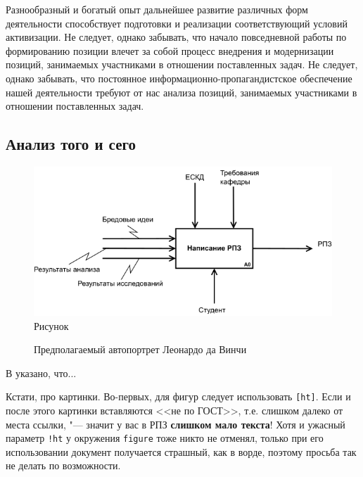 Разнообразный и богатый опыт дальнейшее развитие различных форм деятельности способствует подготовки и реализации соответствующий условий активизации. Не следует, однако забывать, что начало повседневной работы по формированию позиции влечет за собой процесс внедрения и модернизации позиций, занимаемых участниками в отношении поставленных задач. Не следует, однако забывать, что постоянное информационно-пропагандистское обеспечение нашей деятельности требуют от нас анализа позиций, занимаемых участниками в отношении поставленных задач.
\subsection{Анализ того и сего}


\begin{figure}[ht!]
  \centering
  \includegraphics[width=\textwidth]{inc/dia/rpz-idef0}
  \caption{Рисунок}
  \label{fig:fig01}
\end{figure}

\begin{figure}
  \centering
  \caption{Предполагаемый автопортрет Леонардо да Винчи}
  \label{fig:leonardo}
\end{figure}

В \cite{Pup09} указано, что...

Кстати, про картинки. Во-первых, для фигур следует использовать \texttt{[ht]}. Если и после этого картинки вставляются <<не по ГОСТ>>, т.е. слишком далеко от места ссылки, "--- значит у вас в РПЗ \textbf{слишком мало текста}! Хотя и ужасный параметр \texttt{!ht} у окружения \texttt{figure} тоже никто не отменял, только при его использовании документ получается страшный, как в ворде, поэтому просьба так не делать по возможности.

